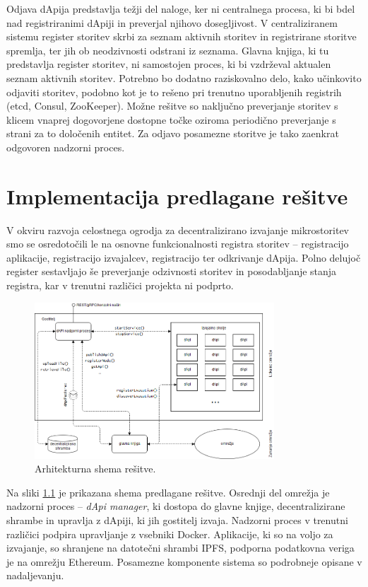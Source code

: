 \documentclass[a4paper, 12pt]{book}
\begin{document}
Odjava dApija predstavlja težji del naloge, ker ni centralnega procesa, ki bi bdel nad registriranimi dApiji in preverjal njihovo dosegljivost.
V centraliziranem sistemu register storitev skrbi za seznam aktivnih storitev in registrirane storitve spremlja, ter jih ob neodzivnosti odstrani iz seznama.
Glavna knjiga, ki tu predstavlja register storitev, ni samostojen proces, ki bi vzdrževal aktualen seznam aktivnih storitev.
Potrebno bo dodatno raziskovalno delo, kako učinkovito odjaviti storitev, podobno kot je to rešeno pri trenutno uporabljenih registrih (etcd, Consul, ZooKeeper).
Možne rešitve so naključno preverjanje storitev s klicem vnaprej dogovorjene dostopne točke oziroma periodično preverjanje s strani za to določenih entitet.
Za odjavo posamezne storitve je tako zaenkrat odgovoren nadzorni proces.

\chapter{Implementacija predlagane rešitve}
\label{ch5}

V okviru razvoja celostnega ogrodja za decentralizirano izvajanje mikrostoritev smo se osredotočili le na osnovne funkcionalnosti registra storitev -- registracijo aplikacije, registracijo izvajalcev, registracijo ter odkrivanje dApija.
Polno delujoč register sestavljajo še preverjanje odzivnosti storitev in posodabljanje stanja registra, kar v trenutni različici projekta ni podprto.

\begin{figure}[h]
	\includegraphics[width=0.8\textwidth]{slike/dApi_sl.png}
	\caption{Arhitekturna shema rešitve.}
	\label{scheme}
\end{figure}

Na sliki \ref{scheme} je prikazana shema predlagane rešitve.
Osrednji del omrežja je nadzorni proces -- \textit{dApi manager}, ki dostopa do glavne knjige, decentralizirane shrambe in upravlja z dApiji, ki jih gostitelj izvaja.
Nadzorni proces v trenutni različici podpira upravljanje z vsebniki Docker.
Aplikacije, ki so na voljo za izvajanje, so shranjene na datotečni shrambi IPFS, podporna podatkovna veriga je na omrežju Ethereum.
Posamezne komponente sistema so podrobneje opisane v nadaljevanju.
\end{document}
